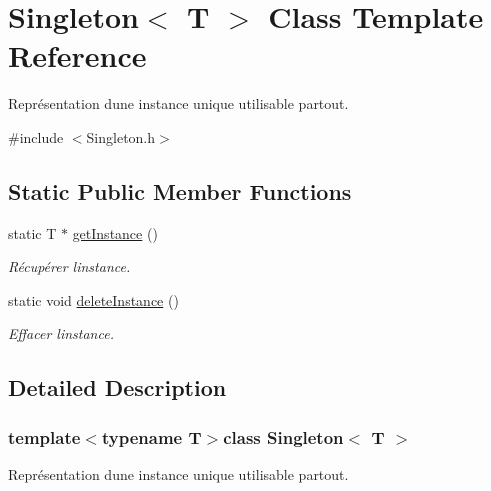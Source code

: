 \hypertarget{class_singleton}{}\section{Singleton$<$ T $>$ Class Template Reference}
\label{class_singleton}


Représentation d\textquotesingle{}une instance unique utilisable partout.  




{\ttfamily \#include $<$Singleton.\+h$>$}

\subsection*{Static Public Member Functions}
\begin{DoxyCompactItemize}
\item 
\hypertarget{class_singleton_ad6f103597095efda360db4a230308666}{}static T $\ast$ \hyperlink{class_singleton_ad6f103597095efda360db4a230308666}{get\+Instance} ()\label{class_singleton_ad6f103597095efda360db4a230308666}

\begin{DoxyCompactList}\small\item\em Récupérer l\textquotesingle{}instance. \end{DoxyCompactList}\item 
\hypertarget{class_singleton_a26fbf9f73eec1a36cbd8e3767b63d5a7}{}static void \hyperlink{class_singleton_a26fbf9f73eec1a36cbd8e3767b63d5a7}{delete\+Instance} ()\label{class_singleton_a26fbf9f73eec1a36cbd8e3767b63d5a7}

\begin{DoxyCompactList}\small\item\em Effacer l\textquotesingle{}instance. \end{DoxyCompactList}\end{DoxyCompactItemize}


\subsection{Detailed Description}
\subsubsection*{template$<$typename T$>$class Singleton$<$ T $>$}

Représentation d\textquotesingle{}une instance unique utilisable partout. 

